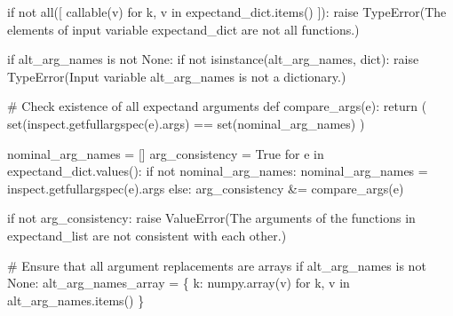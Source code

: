 \documentclass[
  letterpaper,
  DIV=11,
  numbers=noendperiod]{scrartcl}
\newenvironment{Shaded}{\begin{snugshade}}{\end{snugshade}}
\newcommand{\BuiltInTok}[1]{\textcolor[rgb]{0.00,0.23,0.31}{#1}}
\newcommand{\CommentTok}[1]{\textcolor[rgb]{0.37,0.37,0.37}{#1}}
\newcommand{\ControlFlowTok}[1]{\textcolor[rgb]{0.00,0.23,0.31}{#1}}
\newcommand{\KeywordTok}[1]{\textcolor[rgb]{0.00,0.23,0.31}{#1}}
\newcommand{\NormalTok}[1]{\textcolor[rgb]{0.00,0.23,0.31}{#1}}
\newcommand{\OperatorTok}[1]{\textcolor[rgb]{0.37,0.37,0.37}{#1}}
\newcommand{\PreprocessorTok}[1]{\textcolor[rgb]{0.68,0.00,0.00}{#1}}
\newcommand{\StringTok}[1]{\textcolor[rgb]{0.13,0.47,0.30}{#1}}
\newcommand{\VariableTok}[1]{\textcolor[rgb]{0.07,0.07,0.07}{#1}}
\begin{document}
\begin{Shaded}
\begin{Highlighting}[]
  \ControlFlowTok{if} \KeywordTok{not} \BuiltInTok{all}\NormalTok{([ }\BuiltInTok{callable}\NormalTok{(v) }\ControlFlowTok{for}\NormalTok{ k, v }\KeywordTok{in}\NormalTok{ expectand\_dict.items() ]):}
    \ControlFlowTok{raise} \PreprocessorTok{TypeError}\NormalTok{(}\StringTok{\textquotesingle{}The elements of input variable \textasciigrave{}expectand\_dict\textasciigrave{} \textquotesingle{}}
                    \StringTok{\textquotesingle{}are not all functions.\textquotesingle{}}\NormalTok{)}

  \ControlFlowTok{if}\NormalTok{ alt\_arg\_names }\KeywordTok{is} \KeywordTok{not} \VariableTok{None}\NormalTok{:}
    \ControlFlowTok{if} \KeywordTok{not} \BuiltInTok{isinstance}\NormalTok{(alt\_arg\_names, }\BuiltInTok{dict}\NormalTok{):}
      \ControlFlowTok{raise} \PreprocessorTok{TypeError}\NormalTok{(}\StringTok{\textquotesingle{}Input variable \textasciigrave{}alt\_arg\_names\textasciigrave{} \textquotesingle{}}
                      \StringTok{\textquotesingle{}is not a dictionary.\textquotesingle{}}\NormalTok{)}

  \CommentTok{\# Check existence of all expectand arguments}
  \KeywordTok{def}\NormalTok{ compare\_args(e):}
    \ControlFlowTok{return}\NormalTok{ (   }\BuiltInTok{set}\NormalTok{(inspect.getfullargspec(e).args)}
            \OperatorTok{==} \BuiltInTok{set}\NormalTok{(nominal\_arg\_names)              )}

\NormalTok{  nominal\_arg\_names }\OperatorTok{=}\NormalTok{ []}
\NormalTok{  arg\_consistency }\OperatorTok{=} \VariableTok{True}
  \ControlFlowTok{for}\NormalTok{ e }\KeywordTok{in}\NormalTok{ expectand\_dict.values():}
    \ControlFlowTok{if} \KeywordTok{not}\NormalTok{ nominal\_arg\_names:}
\NormalTok{      nominal\_arg\_names }\OperatorTok{=}\NormalTok{ inspect.getfullargspec(e).args}
    \ControlFlowTok{else}\NormalTok{:}
\NormalTok{      arg\_consistency }\OperatorTok{\&=}\NormalTok{ compare\_args(e)}

  \ControlFlowTok{if} \KeywordTok{not}\NormalTok{ arg\_consistency:}
    \ControlFlowTok{raise} \PreprocessorTok{ValueError}\NormalTok{(}\StringTok{\textquotesingle{}The arguments of the functions in \textquotesingle{}}
                     \StringTok{\textquotesingle{}\textasciigrave{}expectand\_list\textasciigrave{} are not consistent \textquotesingle{}}
                     \StringTok{\textquotesingle{}with each other.\textquotesingle{}}\NormalTok{)}

  \CommentTok{\# Ensure that all argument replacements are arrays}
  \ControlFlowTok{if}\NormalTok{ alt\_arg\_names }\KeywordTok{is} \KeywordTok{not} \VariableTok{None}\NormalTok{:}
\NormalTok{    alt\_arg\_names\_array }\OperatorTok{=}\NormalTok{ \{ k: numpy.array(v)}
                            \ControlFlowTok{for}\NormalTok{ k, v }\KeywordTok{in}\NormalTok{ alt\_arg\_names.items() \}}


\end{Highlighting}
\end{Shaded}
\end{document}
